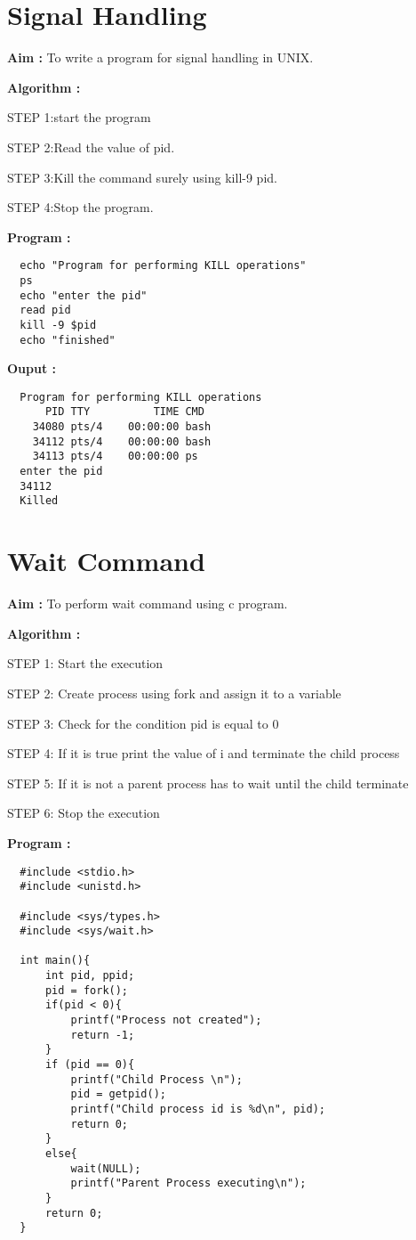 \documentclass[journal,onecolumn]{IEEEtran}
\begin{document}
\section{Signal Handling}
\textbf{Aim : } To write a program for signal handling in UNIX.

\textbf{Algorithm : }
\begin{list}{}{}
  \item STEP 1:start the program
  \item STEP 2:Read the value of
  pid.
  \item STEP 3:Kill the command surely using kill-9 pid.
  \item STEP 4:Stop the program.
\end{list}


\textbf{Program : }
\begin{verbatim}
  echo "Program for performing KILL operations"
  ps
  echo "enter the pid"
  read pid
  kill -9 $pid
  echo "finished"  
\end{verbatim}

\textbf{Ouput : }
\begin{verbatim}
  Program for performing KILL operations
      PID TTY          TIME CMD
    34080 pts/4    00:00:00 bash
    34112 pts/4    00:00:00 bash
    34113 pts/4    00:00:00 ps
  enter the pid
  34112
  Killed
\end{verbatim}

\section{Wait Command}
\textbf{Aim : } To perform wait command using c program.

\textbf{Algorithm : }
\begin{list}{}{}
  \item STEP 1: Start the execution
  \item STEP 2: Create process using fork and assign it to a variable
  \item STEP 3: Check for the condition pid is equal to 0
  \item STEP 4: If it is true print the value of i and terminate the child process
  \item STEP 5: If it is not a parent process has to wait until the child terminate
  \item STEP 6: Stop the execution
\end{list}


\textbf{Program : }
\begin{verbatim}
  #include <stdio.h>
  #include <unistd.h>
  
  #include <sys/types.h>
  #include <sys/wait.h>
  
  int main(){
      int pid, ppid;
      pid = fork();
      if(pid < 0){
          printf("Process not created");
          return -1;
      }
      if (pid == 0){
          printf("Child Process \n");
          pid = getpid();
          printf("Child process id is %d\n", pid);
          return 0;
      }
      else{
          wait(NULL);
          printf("Parent Process executing\n");
      }
      return 0;
  }
\end{verbatim}
\end{document}
